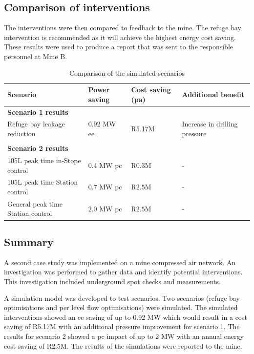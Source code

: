 	\subsection{Comparison of interventions}
	The interventions were then compared to feedback to the mine. The refuge bay intervention is recommended as it will achieve the highest energy cost saving. These results were used to produce a report that was sent to the responsible personnel at Mine B.
	\begin{table}[h!]
		\centering
		\begin{tabular}{p{}
				p{}
				p{}
				p{}}
			\hline 
			 \vspace{0.5em}Scenario & \vspace{0.5em}Power saving & Cost saving (\gls{pa}) & \vspace{0.5em}Additional benefit \\
			\hline
			\multicolumn{4}{l}{\textbf{Scenario 1 results}} \\
			Refuge bay leakage reduction & $ 0.92 $ MW \gls{ee} & R5.17M & Increase in drilling pressure \\
			 \\
			\multicolumn{4}{l}{\textbf{Scenario 2 results}} \\
			105L peak time in-Stope control & $ 0.4 $ MW \gls{pc} & R$ 0.3 $M& - \\
			105L peak time Station control & $ 0.7 $ MW \gls{pc} & R$ 2.5 $M& - \\
			General peak time Station control & $ 2.0 $ MW \gls{pc} & R$ 2.5 $M& - \\
			\hline 
		\end{tabular}
		\caption{Comparison of the simulated scenarios}
		\label{Table: B Comparison}
	\end{table}
	\subsection{Summary}
	A second case study was implemented on a mine compressed air network. An investigation was performed to gather data and identify potential interventions. This investigation included underground spot checks and measurements.
	\par 
	 A simulation model was developed to test scenarios. Two scenarios (refuge bay optimisations and per level flow optimisations) were simulated. The simulated interventions showed an \gls{ee} saving of up to 0.92 MW which would result in a cost saving of R5.17M with an additional pressure improvement for scenario 1. The results for scenario 2 showed a \gls{pc} impact of up to 2 MW with an annual energy cost saving of R2.5M. The results of the simulations were reported to the mine.

